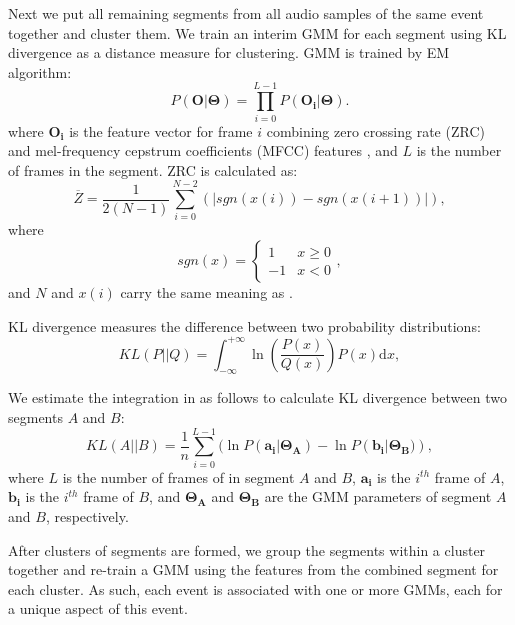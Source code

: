 Next we put all remaining segments from all audio samples of 
the same event together and cluster them.
We train an interim GMM for each segment using KL divergence 
\cite{kullback51:KL} as a distance measure for clustering.
GMM is trained by EM algorithm: 
\begin{equation}
\label{eqn:pp}
P(\mathbf{O}|\mathbf{\Theta}) = \prod_{i=0}^{L - 1}
P(\mathbf{O_i}|\mathbf{\Theta}).
\end{equation}
where $\mathbf{O_i}$ is the feature vector for frame $i$ combining
zero crossing rate (ZRC) and mel-frequency cepstrum coefficients (MFCC) 
features \cite{1561288,1621215}, and $L$ is the number of frames in the segment. 
ZRC is calculated as:
\begin{equation}
\overline{Z} = \frac{1}{2(N - 1)}\sum_{i=0}^{N-2}(|sgn(x(i)) - sgn(x(i + 1))|),
\end{equation}
where
\begin{equation}
sgn(x) = \left\{\begin{array}{ll} 1 & x\geq 0\\ -1 & x < 0\end{array}\right.,
\end{equation}
and $N$ and $x(i)$ carry the same meaning as .

KL divergence measures the difference between two probability distributions:
\begin{equation}
KL(P||Q) = \int_{-\infty}^{+\infty}\ln(\frac{P(x)}{Q(x)})P(x)\mathrm{d}x,
\label{eqn:kl}
\end{equation}

We estimate the integration in  as follows to calculate 
KL divergence between two segments $A$ and $B$:
\begin{equation}
KL(A||B) = \frac{1}{n}\sum_{i=0}^{L-1}(\ln P(\mathbf{a_i}|\mathbf{\Theta_A}) 
- \ln P(\mathbf{b_i}|\mathbf{\Theta_B)}),
\end{equation}
where $L$ is the number of frames of in segment $A$ and $B$, 
$\mathbf{a_i}$ is the $i^{th}$ frame of $A$, 
$\mathbf{b_i}$ is the $i^{th}$ frame of $B$, and 
$\mathbf{\Theta_A}$ and $\mathbf{\Theta_B}$ are the GMM parameters of 
segment $A$ and $B$, respectively.

After clusters of segments are formed, we group the segments within a cluster
together and re-train a GMM using the features from the combined segment for
each cluster. As such, each event is associated with one or more
GMMs, each for a unique aspect of this event.

